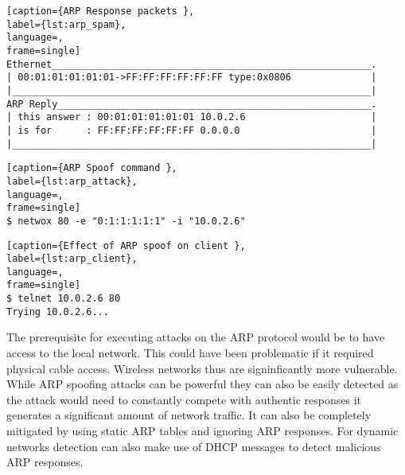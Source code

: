 \begin{minipage}{\linewidth}
\begin{lstlisting}[caption={ARP Response packets },
label={lst:arp_spam},
language=,
frame=single]
Ethernet________________________________________________________.
| 00:01:01:01:01:01->FF:FF:FF:FF:FF:FF type:0x0806              |
|_______________________________________________________________|
ARP Reply_______________________________________________________.
| this answer : 00:01:01:01:01:01 10.0.2.6                      |
| is for      : FF:FF:FF:FF:FF:FF 0.0.0.0                       |
|_______________________________________________________________|
\end{lstlisting}
\end{minipage}

\begin{minipage}{\linewidth}
\begin{lstlisting}[caption={ARP Spoof command },
label={lst:arp_attack},
language=,
frame=single]
$ netwox 80 -e "0:1:1:1:1:1" -i "10.0.2.6"
\end{lstlisting}
\end{minipage}

\begin{minipage}{\linewidth}
\begin{lstlisting}[caption={Effect of ARP spoof on client },
label={lst:arp_client},
language=,
frame=single]
$ telnet 10.0.2.6 80
Trying 10.0.2.6...
\end{lstlisting}
\end{minipage}

The prerequisite for executing attacks on the ARP protocol would be to have access to the local network. This could have been problematic if it required physical cable access. Wireless networks thus are signinficantly more vulnerable. While ARP spoofing attacks can be powerful they can also be easily detected as the attack would need to constantly compete with authentic responses it generates a significant amount of network traffic. It can also be completely mitigated by using static ARP tables and ignoring ARP responses. For dynamic networks detection can also make use of DHCP messages to detect malicious ARP responses.

